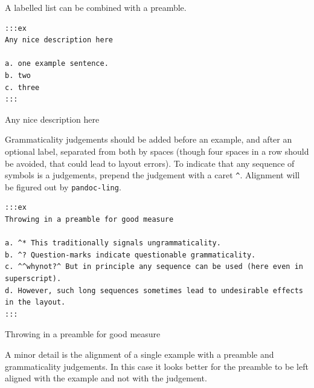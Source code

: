 \documentclass[
]{article}
\begin{document}
A labelled list can be combined with a preamble.

\begin{verbatim}
:::ex
Any nice description here

a. one example sentence.
b. two
c. three
:::
\end{verbatim}

\begin{samepage}
\begin{exe} \judgewidth{}
  \ex Any nice description here
  \begin{xlist}
  \end{xlist}
  \label{ex4.5}
\end{exe}
\end{samepage}

Grammaticality judgements should be added before an example, and after
an optional label, separated from both by spaces (though four spaces in
a row should be avoided, that could lead to layout errors). To indicate
that any sequence of symbols is a judgements, prepend the judgement with
a caret \texttt{\^{}}. Alignment will be figured out by
\texttt{pandoc-ling}.

\begin{verbatim}
:::ex
Throwing in a preamble for good measure

a. ^* This traditionally signals ungrammaticality.
b. ^? Question-marks indicate questionable grammaticality.
c. ^^whynot?^ But in principle any sequence can be used (here even in superscript).
d. However, such long sequences sometimes lead to undesirable effects in the layout.
:::
\end{verbatim}

\begin{samepage}
\begin{exe} 
  \ex Throwing in a preamble for good measure
  \begin{xlist}
  \end{xlist}
  \label{ex4.6}
\end{exe}
\end{samepage}

A minor detail is the alignment of a single example with a preamble and
grammaticality judgements. In this case it looks better for the preamble
to be left aligned with the example and not with the judgement.
\end{document}
